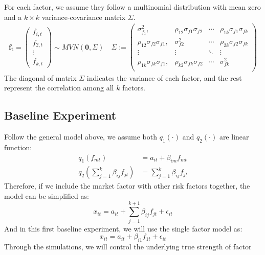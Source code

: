 \documentclass[12pt]{article}
\begin{document}
 For each factor, we assume they follow a multinomial distribution with mean zero and a $k\times k$ variance-covariance matrix $\Sigma$. 
\begin{align*}
\mathbf{f_t} = \begin{pmatrix}
f_{i,t}\\f_{2,t}\\\vdots\\f_{k,t}
\end{pmatrix} \sim MVN(\mathbf{0}, \Sigma) \quad
 \Sigma := 
\begin{pmatrix}
\sigma^2_{f_1}, & \rho_{12}\sigma_{f1}\sigma_{f2} &\cdots  & \rho_{1k}\sigma_{f1}\sigma_{fk}\\
\rho_{12}\sigma_{f2}\sigma_{f1}, & \sigma^2_{f2} &\cdots  & \rho_{2k}\sigma_{f2}\sigma_{fk}\\
\vdots & \vdots & \ddots & \vdots \\
\rho_{1k}\sigma_{fk}\sigma_{f1}, & \rho_{k2}\sigma_{fk}\sigma_{f2} &\cdots  & \sigma^2_{fk}\\
\end{pmatrix}
\end{align*}
The diagonal of matrix $\Sigma$ indicates the variance of each factor, and the rest represent the correlation among all $k$ factors.

\subsection{Baseline Experiment}\label{base}
Follow the general model above, we assume both $q_1(\cdot)$ and $q_2(\cdot)$ are linear function:
\begin{align*}
q_1({f_{mt}}) &= a_{it} +\beta_{im} f_{mt}\\
q_2(\sum_{j = 1}^{k}\beta_{ij}f_{jt}) &=\sum_{j = 1}^{k}\beta_{ij}f_{jt}
\end{align*}
Therefore, if we include the market factor with other risk factors together, the model can be simplified as:
	\[   x_{it} = a_{it} + \sum_{j = 1}^{k+1}  \beta_{ij}f_{jt} +\epsilon_{it}  \tag{6} \label{simplified_multi}  \]
And in this first baseline experiment, we will  use the single factor model as:
\[  x_{it} = a_{it} +  \beta_{i1}f_{1t} +\epsilon_{it} \tag{7} \label{singlefactor}  \]
Through the simulations, we will control the underlying true strength of factor 
\end{document}
